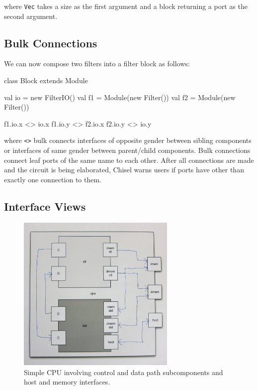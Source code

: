\documentclass[twocolumn,10pt]{article}
\begin{document}

\noindent
where \verb+Vec+ takes a size as the first argument and a block returning a port as the second argument.

\subsection{Bulk Connections}

We can now compose two filters into a filter block as follows:

\begin{scala}
class Block extends Module { 
  val io = new FilterIO()
  val f1 = Module(new Filter())
  val f2 = Module(new Filter())

  f1.io.x <> io.x
  f1.io.y <> f2.io.x
  f2.io.y <> io.y
}
\end{scala}

\noindent
where \verb+<>+ bulk connects interfaces of opposite gender between
sibling components or interfaces of same gender between parent/child components. 
Bulk connections connect leaf ports of the same name to each other.
After all connections are made and the circuit is being elaborated,
Chisel warns users if ports have other than exactly one connection to them.

\subsection{Interface Views}

\begin{figure}
\centerline{\includegraphics[width=3in]{figs/cpu.png}}
\caption{Simple CPU involving control and data path subcomponents and host and memory interfaces.}
\label{fig:cpu}
\end{figure}
\end{document}
